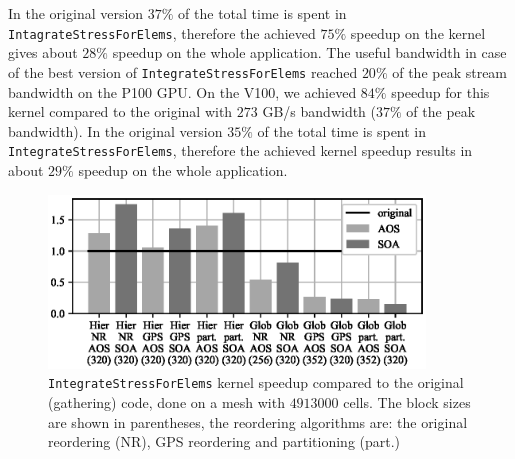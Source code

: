In the original version $37\%$ of the total time is spent in 
\texttt{IntagrateStressForElems}, therefore the achieved $75\%$ speedup on
the kernel gives about $28\%$ speedup on the whole application. The
useful bandwidth in case of the best version of \texttt{IntegrateStressForElems}
reached $20\%$ of the peak stream bandwidth on the P100 GPU. On the V100, 
we achieved $84\%$ speedup for this kernel compared to the
original with $273$ GB/s bandwidth ($37\%$ of the peak bandwidth). In the
original version $35\%$ of the total time is spent in 
\texttt{IntegrateStressForElems}, therefore the achieved kernel speedup 
results in about $29\%$ speedup on the whole application.

\begin{figure}[Htbp]
  \centering
  \includegraphics[width=10cm]{fig/lulesh_speedup.eps}
  \caption{\texttt{IntegrateStressForElems} kernel speedup compared to the
  original (gathering) code, done on a mesh with $4913000$ cells. The block
  sizes are shown in parentheses, the reordering algorithms are: the original
  reordering (NR), GPS reordering and partitioning (part.)}
  \label{fig:lulesh_speedup}
\end{figure}

